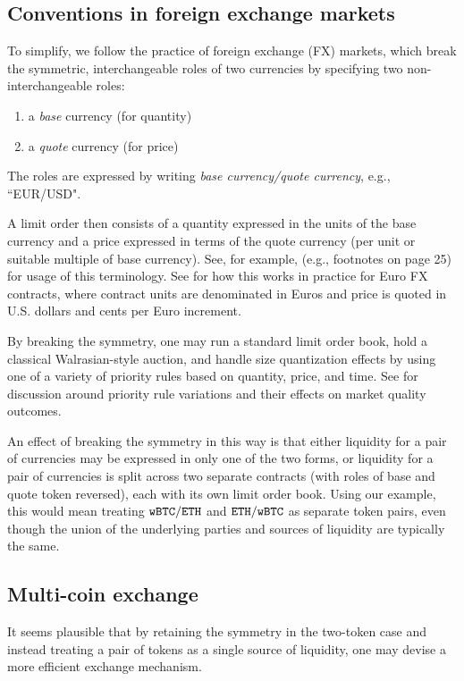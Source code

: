 \documentclass[11pt, reqno]{amsart}
\theoremstyle{definition}
\theoremstyle{remark}
\newcommand{\BTC}{\textnormal{\texttt{wBTC}}}
\newcommand{\ETH}{\textnormal{\texttt{ETH}}}
\begin{document}
\subsection{Conventions in foreign exchange markets}
To simplify, we follow the practice of foreign exchange (FX) markets,
which break the symmetric, interchangeable roles of two currencies by
specifying two non-interchangeable roles:
\begin{enumerate}
	\item a \emph{base} currency (for quantity)
	\item a \emph{quote} currency (for price)
\end{enumerate}
The roles are expressed by writing \emph{base currency/quote currency}, e.g.,
``EUR/USD".

A limit order then consists of a quantity expressed in the units of the base
currency and a price expressed in terms of the quote currency (per unit or
suitable multiple of base currency). See, for example, \cite{Cme23} (e.g.,
footnotes on page 25) for usage of this terminology. See \cite{CmeFx} for how
this works in practice for Euro FX contracts, where contract units are
denominated in Euros and price is quoted in U.S. dollars and cents per Euro
increment.

By breaking the symmetry, one may run a standard limit order book, hold a
classical Walrasian-style auction, and handle size quantization effects by
using one of a variety of priority rules based on quantity, price, and time.
See \cite{BeLaLiVa22} for discussion around priority rule variations and their
effects on market quality outcomes.

An effect of breaking the symmetry in this way is that either liquidity for a
pair of currencies may be expressed in only one of the two forms, or liquidity
for a pair of currencies is split across two separate contracts (with roles of
base and quote token reversed), each with its own limit order book.
Using our example, this would mean treating $\BTC/\ETH$ and $\ETH/\BTC$ as
separate token pairs, even though the union of the underlying parties and
sources of liquidity are typically the same.

\subsection{Multi-coin exchange}
It seems plausible that by retaining the symmetry in the two-token case and
instead treating a pair of tokens as a single source of liquidity, one may
devise a more efficient exchange mechanism.
\end{document}
